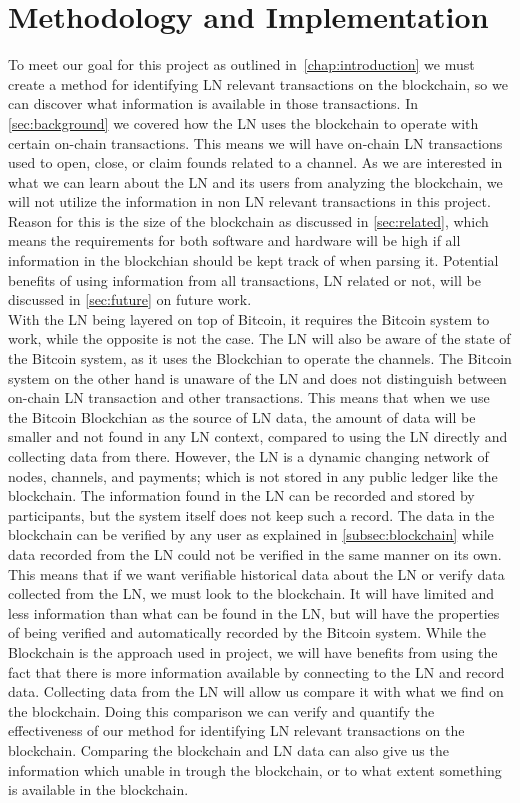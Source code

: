 \chapter{Methodology and Implementation}
\label{chap:metodology}

To meet our goal for this project as outlined in~\cref{chap:introduction} we must create a method for identifying LN relevant transactions on the blockchain, so we can discover what information is available in those transactions. In \cref{sec:background} we covered how the LN uses the blockchain to operate with certain on-chain transactions. This means we will have on-chain LN transactions used to open, close, or claim founds related to a channel. As we are interested in what we can learn about the LN and its users from analyzing the blockchain, we will not utilize the information in non LN relevant transactions in this project. Reason for this is the size of the blockchain as discussed in \cref{sec:related}, which means the requirements for both software and hardware will be high if all information in the blockchian should be kept track of when parsing it. Potential benefits of using information from all transactions, LN related or not, will be discussed in \cref{sec:future} on future work. 
\\

With the LN being layered on top of Bitcoin, it requires the Bitcoin system to work, while the opposite is not the case. The LN will also be aware of the state of the Bitcoin system, as it uses the Blockchian to operate the channels. The Bitcoin system on the other hand is unaware of the LN and does not distinguish between on-chain LN transaction and other transactions. This means that when we use the Bitcoin Blockchian as the source of LN data, the amount of data will be smaller and not found in any LN context, compared to using the LN directly and collecting data from there. However, the LN is a dynamic changing network of nodes, channels, and payments; which is not stored in any public ledger like the blockchain. The information found in the LN can be recorded and stored by participants, but the system itself does not keep such a record. The data in the blockchain can be verified by any user as explained in \cref{subsec:blockchain} while data recorded from the LN could not be verified in the same manner on its own.
This means that if we want verifiable historical data about the LN or verify data collected from the LN, we must look to the blockchain. It will have limited and less information than what can be found in the LN, but will have the properties of being verified and automatically recorded by the Bitcoin system.
While the Blockchain is the approach used in project, we will have benefits from using the fact that there is more information available by connecting to the LN and record data. Collecting data from the LN will allow us compare it with what we find on the blockchain. Doing this comparison we can verify and quantify the effectiveness of our method for identifying LN relevant transactions on the blockchain. Comparing the blockchain and LN data can also give us the information which unable in trough the blockchain, or to what extent something is available in the blockchain.  
\\


